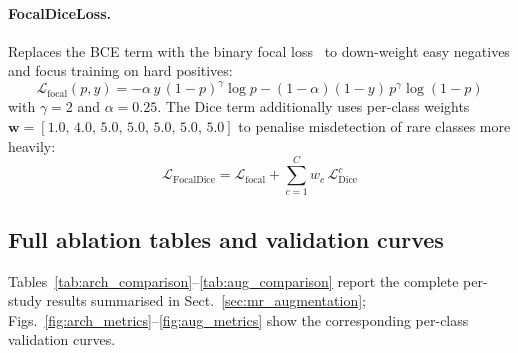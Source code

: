 \documentclass{aa}
\begin{document}
\begin{appendix}
\paragraph{FocalDiceLoss.}
Replaces the BCE term with the binary focal loss~\citep{lin2017focal} to down-weight easy negatives and focus training on hard positives:
\[
\mathcal{L}_{\text{focal}}(p,y) = -\alpha\,y\,(1-p)^\gamma \log p
                                   -(1-\alpha)(1-y)\,p^\gamma \log(1-p)
\]
with $\gamma=2$ and $\alpha=0.25$. The Dice term additionally uses per-class weights $\mathbf{w} = [1.0,\,4.0,\,5.0,\,5.0,\,5.0,\,5.0,\,5.0]$ to penalise misdetection of rare classes more heavily:
\[
\mathcal{L}_{\text{FocalDice}} = \mathcal{L}_{\text{focal}} + \sum_{c=1}^{C} w_c \,\mathcal{L}_{\text{Dice}}^c
\]

\subsection{Full ablation tables and validation curves}

Tables~\ref{tab:arch_comparison}--\ref{tab:aug_comparison} report the complete per-study results summarised in Sect.~\ref{sec:mr_augmentation}; Figs.~\ref{fig:arch_metrics}--\ref{fig:aug_metrics} show the corresponding per-class validation curves.

\begin{table}[htbp]
\centering
\caption{Architecture ablation on the full dataset (Tesla T4, 30 epochs). Metrics are macro-averaged across the seven classes; Ridge AP is the single-class AP of \texttt{wrinkle\_ridge}.}
\label{tab:arch_comparison}
\end{table}


\end{appendix}
\end{document}
